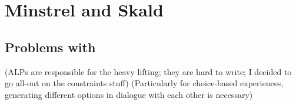 \chapter{Minstrel and Skald}

\section{Problems with }

(ALPs are responsible for the heavy lifting; they are hard to write; I decided to go all-out on the constraints stuff)
(Particularly for choice-based experiences, generating different options in dialogue with each other is necessary)
